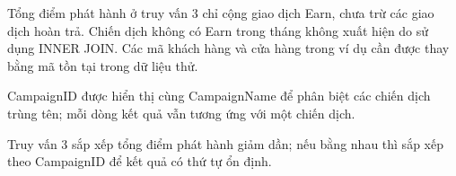 Tổng điểm phát hành ở truy vấn 3 chỉ cộng giao dịch Earn, chưa trừ các giao dịch hoàn trả. Chiến dịch không có Earn trong tháng không xuất hiện do sử dụng INNER JOIN. Các mã khách hàng và cửa hàng trong ví dụ cần được thay bằng mã tồn tại trong dữ liệu thử.

CampaignID được hiển thị cùng CampaignName để phân biệt các chiến dịch trùng tên; mỗi dòng kết quả vẫn tương ứng với một chiến dịch.

Truy vấn 3 sắp xếp tổng điểm phát hành giảm dần; nếu bằng nhau thì sắp xếp theo CampaignID để kết quả có thứ tự ổn định.
